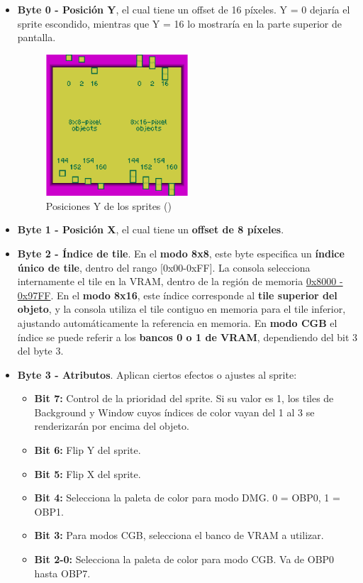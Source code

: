 \begin{itemize}
    \item \textbf{Byte 0 - Posición Y}, el cual tiene un offset de 16 píxeles. Y = 0 dejaría el sprite escondido, mientras que Y = 16 lo mostraría en la parte superior de pantalla.
    
    \begin{figure}[H]
        \centering
        \includegraphics[width=0.5\textwidth]{include/images/y_position.png}
        \caption{Posiciones Y de los sprites (\cite{newpandocs})}
        \label{figure:y_positions}
    \end{figure}

    \item \textbf{Byte 1 - Posición X}, el cual tiene un \textbf{offset de 8 píxeles}.
    \item \textbf{Byte 2 - Índice de tile}. En el \textbf{modo 8x8}, este byte especifica un \textbf{índice único de tile}, dentro del rango [0x00-0xFF]. La consola selecciona internamente el tile en la VRAM, dentro de la región de memoria \hyperref[mem:vram_1]{0x8000 - 0x97FF}. En el \textbf{modo 8x16}, este índice corresponde al \textbf{tile superior del objeto}, y la consola utiliza el tile contiguo en memoria para el tile inferior, ajustando automáticamente la referencia en memoria. En \textbf{modo CGB} el índice se puede referir a los \textbf{bancos 0 o 1 de VRAM}, dependiendo del bit 3 del byte 3.
    \item \textbf{Byte 3 - Atributos}. Aplican ciertos efectos o ajustes al sprite:
        \begin{itemize}
            \item \textbf{Bit 7:} Control de la prioridad del sprite. Si su valor es 1, los tiles de Background y Window cuyos índices de color vayan del 1 al 3 se renderizarán por encima del objeto.
            \item \textbf{Bit 6:} Flip Y del sprite.
            \item \textbf{Bit 5:} Flip X del sprite.
            \item \textbf{Bit 4:} Selecciona la paleta de color para modo DMG. 0 = OBP0, 1 = OBP1.
            \item \textbf{Bit 3:} Para modos CGB, selecciona el banco de VRAM a utilizar.
            \item \textbf{Bit 2-0:} Selecciona la paleta de color para modo CGB. Va de OBP0 hasta OBP7.
        \end{itemize}

\end{itemize}

